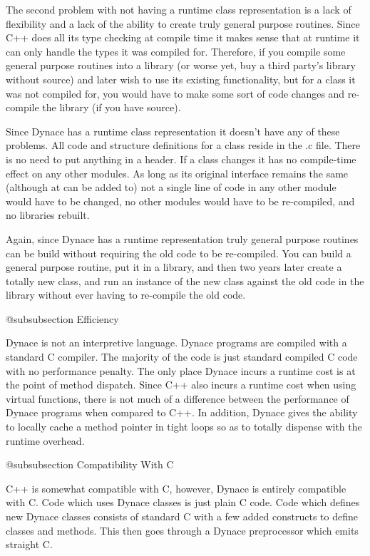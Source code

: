 The second problem with not having a runtime class representation is a
lack of flexibility and a lack of the ability to create truly general
purpose routines.  Since C++ does all its type checking at compile time
it makes sense that at runtime it can only handle the types it was
compiled for.  Therefore, if you compile some general purpose routines
into a library (or worse yet, buy a third party's library without source)
and later wish to use its existing functionality, but for a class it was
not compiled for, you would have to make some sort of code changes and
re-compile the library (if you have source).

Since Dynace has a runtime class representation it doesn't have any of
these problems.  All code and structure definitions for a class reside
in the .c file.  There is no need to put anything in a header.  If a
class changes it has no compile-time effect on any other modules.  As
long as its original interface remains the same (although at can be
added to) not a single line of code in any other module would have to
be changed, no other modules would have to be re-compiled, and no
libraries rebuilt.

Again, since Dynace has a runtime representation truly general purpose
routines can be build without requiring the old code to be
re-compiled.  You can build a general purpose routine, put it in a
library, and then two years later create a totally new class, and run
an instance of the new class against the old code in the library
without ever having to re-compile the old code.

@subsubsection Efficiency


Dynace is not an interpretive language. Dynace programs are compiled with a
standard C compiler.  The majority of the code is just standard compiled
C code with no performance penalty.  The only place Dynace incurs a runtime
cost is at the point of method dispatch.  Since C++ also incurs a runtime
cost when using virtual functions, there is not much of a difference
between the performance of Dynace programs when compared to C++.  In addition,
Dynace gives the ability to locally cache a method pointer in tight loops so
as to totally dispense with the runtime overhead.


@subsubsection Compatibility With C

C++ is somewhat compatible with C, however, Dynace is entirely
compatible with C.  Code which uses Dynace classes is just plain C
code.  Code which defines new Dynace classes consists of standard C
with a few added constructs to define classes and methods.  This then
goes through a Dynace preprocessor which emits straight C.

